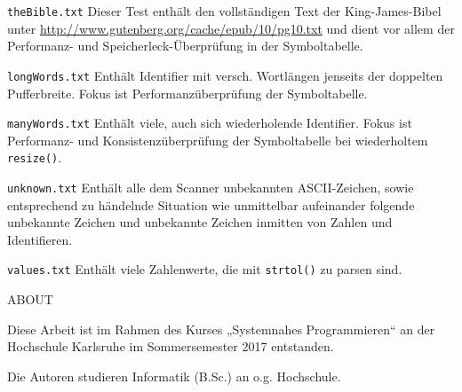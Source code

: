\documentclass[
a4paper,   %
11pt,      %
oneside,   %
onecolumn, %
final      %
]{article}
\newcommand{\code}[1]{\lstinline$#1$}
\begin{document}
\begin{description}
\item{\texttt{theBible.txt}} Dieser Test enthält den vollständigen Text der King-James-Bibel unter \url{http://www.gutenberg.org/cache/epub/10/pg10.txt} und dient vor allem der Performanz- und Speicherleck-Überprüfung in der Symboltabelle.

\item{\texttt{longWords.txt}} Enthält Identifier mit versch. Wortlängen jenseits der doppelten Pufferbreite. Fokus ist Performanzüberprüfung der Symboltabelle.

\item{\texttt{manyWords.txt}} Enthält viele, auch sich wiederholende Identifier. Fokus ist Performanz- und Konsistenzüberprüfung der Symboltabelle bei wiederholtem \code{resize()}.

\item{\texttt{unknown.txt}} Enthält alle dem Scanner unbekannten ASCII-Zeichen, sowie entsprechend zu händelnde Situation wie unmittelbar aufeinander folgende unbekannte Zeichen und unbekannte Zeichen inmitten von Zahlen und Identifieren.

\item{\texttt{values.txt}} Enthält viele Zahlenwerte, die mit \code{strtol()} zu parsen sind.

\end{description}






\appendix


\begin{description}
\item{ABOUT}
    \begin{description}
    \item{Diese Arbeit} ist im Rahmen des Kurses „Systemnahes Programmieren“ an der Hochschule Karlsruhe im Sommersemester 2017 entstanden.

    \item{Die Autoren} studieren Informatik (B.Sc.) an o.g. Hochschule.
\end{description}
\end{description}


%
%
\end{document}
